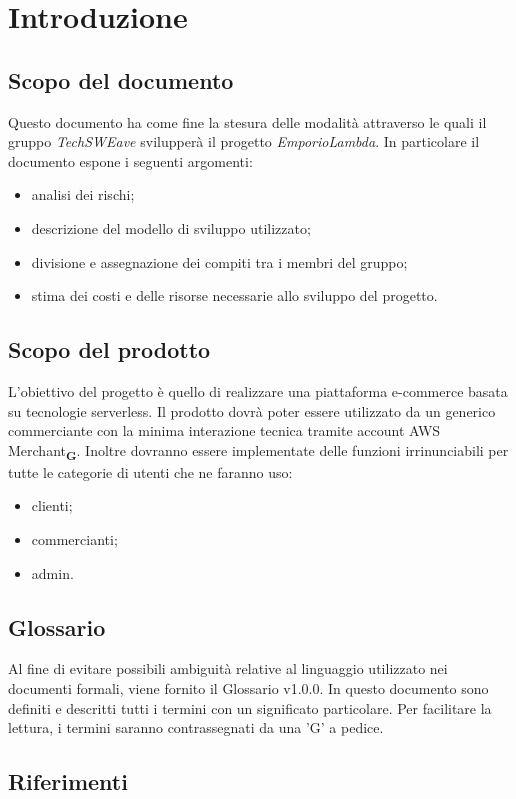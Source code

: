 \section{Introduzione}
\subsection{Scopo del documento}
Questo documento ha come fine la stesura delle modalità attraverso le quali il gruppo \emph{TechSWEave} svilupperà il progetto \emph{EmporioLambda}. In particolare il documento espone i seguenti argomenti:
\begin{itemize}
    \item analisi dei rischi;
    \item descrizione del modello di sviluppo utilizzato;
    \item divisione e assegnazione dei compiti tra i membri del gruppo;
    \item stima dei costi e delle risorse necessarie allo sviluppo del progetto.
\end{itemize}
\subsection{Scopo del prodotto}
L'obiettivo del progetto è quello di realizzare una piattaforma e-commerce basata su tecnologie serverless. Il prodotto dovrà poter essere utilizzato da un generico commerciante con la minima interazione tecnica tramite account AWS Merchant\textsubscript{\textbf{G}}. Inoltre dovranno essere implementate delle funzioni irrinunciabili per tutte le categorie di utenti che ne faranno uso:
\begin{itemize}
    \item clienti;
    \item commercianti;
    \item admin.
\end{itemize}
\subsection{Glossario}
Al fine di evitare possibili ambiguità relative al linguaggio utilizzato nei documenti formali, viene fornito il Glossario v1.0.0. In questo documento sono definiti e descritti tutti i termini con un significato particolare. Per facilitare la lettura, i termini saranno contrassegnati da una ’G’ a pedice.
\subsection{Riferimenti}
